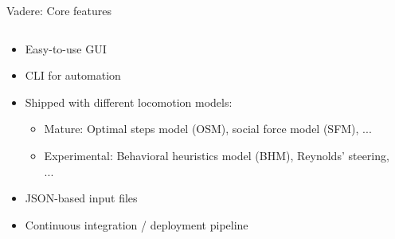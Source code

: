 \documentclass[compress,t,usenames,xcolor=dvipsnames]{beamer}
\begin{document}
\begin{frame}{Vadere: Core features \hfill \hyperlink{BackupSlides}{}}
    \begin{columns}
        \begin{column}{0.45\textwidth}
            \begin{itemize}
                \item<1-> Easy-to-use GUI
                \item<2-> CLI for automation
                \item<3-> Shipped with different locomotion models:
                \begin{itemize}
                    \item<3-> Mature: Optimal steps model (OSM), social force model (SFM), ...
                    \item<3-> Experimental: Behavioral heuristics model (BHM), Reynolds' steering, ...
                \end{itemize}
                \item<4-> JSON-based input files
                \item<5-> Continuous integration / deployment pipeline
            \end{itemize}
        \end{column}
        \begin{column}{0.45\textwidth}
            \vspace*{-1.5ex}
\end{column}
\end{columns}
\end{frame}
\end{document}
